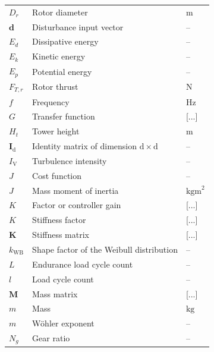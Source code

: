 \begin{longtable}{lll}
    $D_r$ & Rotor diameter & $\mathrm{m}$ \\
    $\bm{d}$ & Disturbance input vector & --  \\
    $E_d$ & Dissipative energy & --\\
    $E_k$ & Kinetic energy & --\\
    $E_p$ & Potential energy & --\\
    $F_{T,r}$ & Rotor thrust & $\mathrm{N}$ \\
    $f$ & Frequency & $\mathrm{Hz}$ \\
    $G$ & Transfer function & [...] \\
    $H_t$ & Tower height & $\mathrm{m}$ \\
    $\bm{I}_\mathrm{d}$ & Identity matrix of dimension $\mathrm{d}\times {\mathrm{d}}$& -- \\
    $I_\mathrm{V}$ & Turbulence intensity & -- \\
    $J$ & Cost function & -- \\
    $J$ & Mass moment of inertia & $\mathrm{kgm}^2$ \\
    $K$ & Factor or controller gain & [...] \\
    $K$ & Stiffness factor & [...] \\
    $\mathbf{K}$ & Stiffness matrix & [...] \\
    $k_{\text{WB}}$ & Shape factor of the Weibull distribution & -- \\
    $L$ & Endurance load cycle count & -- \\
    $l$ & Load cycle count & -- \\
    $\mathbf{M}$ & Mass matrix & [...] \\  %
    $m$ & Mass & $\mathrm{kg}$ \\
    $m$ & Wöhler exponent & -- \\
    $N_g$ & Gear ratio & -- \\

\end{longtable}
